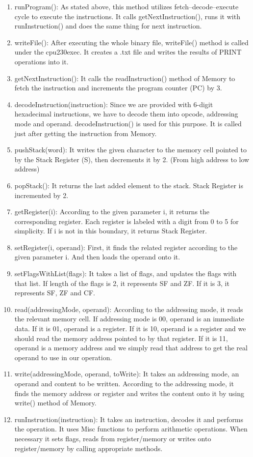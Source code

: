 \documentclass[12pt,a4paper]{article}
\begin{document}
\begin{enumerate}
    \item runProgram(): As stated above, this method utilizes fetch–decode–execute cycle to execute the instructions. It calls getNextInstruction(), runs it with runInstruction() and does the same thing for next instruction.
    \item writeFile(): After executing the whole binary file, writeFile() method is called under the cpu230exec. It creates a .txt file and writes the results of PRINT operations into it.
    \item getNextInstruction(): It calls the readInstruction() method of Memory to fetch the instruction and increments the program counter (PC) by 3.
    \item decodeInstruction(instruction): Since we are provided with 6-digit hexadecimal instructions, we have to decode them into opcode, addressing mode and operand. decodeInstruction() is used for this purpose. It is called just after getting the instruction from Memory.
    \item pushStack(word):  It writes the given character to the memory cell pointed to by the Stack Register (S), then decrements it by 2. (From high address to low address)
    \item popStack(): It returns the last added element to the stack. Stack Register is incremented by 2.
    \item getRegister(i): According to the given parameter i, it returns the corresponding register. Each register is labeled with a digit from 0 to 5 for simplicity. If i is not in this boundary, it returns Stack Register.
    \item setRegister(i, operand): First, it finds the related register according to the given parameter i. And then loads the operand onto it. 
    \item setFlagsWithList(flags): It takes a list of flags, and updates the flags with that list. If length of the flags is 2, it represents SF and ZF. If it is 3, it represents SF, ZF and CF.
    \item read(addressingMode, operand): According to the addressing mode, it reads the relevant memory cell. If addressing mode is 00, operand is an immediate data. If it is 01, operand is a register. If it is 10, operand is a register and we should read the memory address pointed to by that register. If it is 11, operand is a memory address and we simply read that address to get the real operand to use in our operation.
    \item write(addressingMode, operand, toWrite): It takes an addressing mode, an operand and content to be written. According to the addressing mode, it finds the memory address or register and writes the content onto it by using write() method of Memory.
    \item runInstruction(instruction): It takes an instruction, decodes it and performs the operation. It uses Misc functions to perform arithmetic operations. When necessary it sets flags, reads from register/memory or writes onto register/memory by calling appropriate methods.
\end{enumerate}
\end{document}
